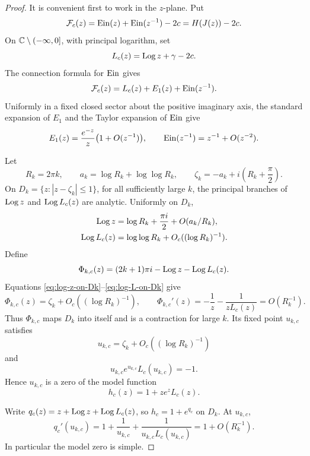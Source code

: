 \begin{proof}
It is convenient first to work in the $z$-plane.  Put
\[
 \mathcal F_c(z)=\operatorname{Ein}(z)+\operatorname{Ein}(z^{-1})-2c
                =H(J(z))-2c.
\]
On $\mathbb C\setminus(-\infty,0]$, with principal logarithm, set
\[
 L_c(z)=\operatorname{Log} z+\gamma-2c.
\]
The connection formula for $\operatorname{Ein}$ gives
\begin{equation}\label{eq:Fc-connection}
 \mathcal F_c(z)=L_c(z)+E_1(z)+\operatorname{Ein}(z^{-1}).
\end{equation}
Uniformly in a fixed closed sector about the positive imaginary axis,
the standard expansion of $E_1$ \cite{DLMF} and the Taylor expansion of
$\operatorname{Ein}$ give
\begin{equation}\label{eq:Fc-asymptotic-input}
 E_1(z)=\frac{e^{-z}}z\bigl(1+O(z^{-1})\bigr),
 \qquad
 \operatorname{Ein}(z^{-1})=z^{-1}+O(z^{-2}).
\end{equation}

Let
\[
 R_k=2\pi k,\qquad
 a_k=\log R_k+\log\log R_k,\qquad
 \zeta_k=-a_k+i\left(R_k+\frac\pi2\right).
\]
On $D_k=\{z:|z-\zeta_k|\leq1\}$, for all sufficiently large $k$, the
principal branches of $\operatorname{Log} z$ and $\operatorname{Log} L_c(z)$ are analytic.  Uniformly
on $D_k$,
\begin{align}
 \operatorname{Log} z&=\log R_k+\frac{\pi i}{2}
          +O(a_k/R_k),\label{eq:log-z-on-Dk}\\
 \operatorname{Log} L_c(z)&=\log\log R_k+O_c((\log R_k)^{-1}).
 \label{eq:log-L-on-Dk}
\end{align}
Define
\[
 \Phi_{k,c}(z)=(2k+1)\pi i-\operatorname{Log} z-\operatorname{Log} L_c(z).
\]
Equations \eqref{eq:log-z-on-Dk}--\eqref{eq:log-L-on-Dk} give
\[
 \Phi_{k,c}(z)=\zeta_k+O_c((\log R_k)^{-1}),
 \qquad
 \Phi_{k,c}'(z)=-\frac1z-\frac1{zL_c(z)}=O(R_k^{-1}).
\]
Thus $\Phi_{k,c}$ maps $D_k$ into itself and is a contraction for large
$k$.  Its fixed point $u_{k,c}$ satisfies
\begin{equation}\label{eq:model-root-asymptotic}
 u_{k,c}=\zeta_k+O_c((\log R_k)^{-1})
\end{equation}
and
\[
 u_{k,c}e^{u_{k,c}}L_c(u_{k,c})=-1.
\]
Hence $u_{k,c}$ is a zero of the model function
\[
 h_c(z)=1+ze^zL_c(z).
\]

Write $q_c(z)=z+\operatorname{Log} z+\operatorname{Log} L_c(z)$, so
$h_c=1+e^{q_c}$ on $D_k$.  At $u_{k,c}$,
\begin{equation}\label{eq:model-derivative}
 q_c'(u_{k,c})
 =1+\frac1{u_{k,c}}+\frac1{u_{k,c}L_c(u_{k,c})}
 =1+O(R_k^{-1}).
\end{equation}
In particular the model zero is simple.


\end{proof}
